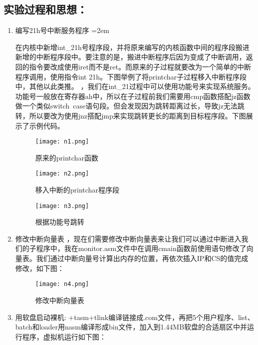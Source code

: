 \documentclass[UTF8]{article}
\newcommand{\bg}{\colorbox{gray!13}}%
\begin{document}
\subsection{实验过程和思想：}
\begin{enumerate}[1)]
\heiti\setlength{\itemsep}{0em}
	\item 编写21h号中断服务程序
	\parindent=2em %
	\par\indent 在内核中新增int\_21h号程序段，并将原来编写的内核函数中间的程序段搬进新增的中断程序段中。要注意的是，搬进中断程序后因为变成了中断调用，返回的指令要改成使用iret而不是ret。而原来的子过程就要改为一个简单的中断程序调用，使用指令\bg{int 21h}。下图举例了将\bg{printchar}子过程移入中断程序段中，其他以此类推。
，我们在int\_21过程中可以使用功能号来实现系统服务。功能号一般放在寄存器\bg{ah}中，所以在子过程前我们需要用cmp函数搭配jz函数做一个类似\bg{switch\ case}语句段。但会发现因为跳转距离过长，导致jz无法跳转，所以要改为使用jnz搭配jmp来实现跳转更长的距离到目标程序段。下图展示了示例代码。
			\begin{figure}[htbp]
			\begin{minipage}[t]{\linewidth}
			\centering
			\texttt{[image: n1.png]}
			\caption{原来的printchar函数}
			\end{minipage}
			\begin{minipage}[t]{\linewidth}
				\centering
			\texttt{[image: n2.png]}
			\caption{移入中断的printchar程序段}
			\end{minipage}
			\begin{minipage}[t]{\linewidth}
			\centering
			\texttt{[image: n3.png]}
			\caption{根据功能号跳转}
			\end{minipage}
		\end{figure}
	\newpage
	\item 修改中断向量表
	，现在们需要修改中断向量表来让我们可以通过中断进入我们的子程序中，我在\bg{monitor.asm}文件中在调用\bg{cmain}函数前使用语句修改了向量表。我们通过中断向量号计算出内存的位置，再依次插入IP和CS的值完成修改，如下图：
	\begin{figure}[htbp]
			\centering
			\texttt{[image: n4.png]}
			\caption{修改中断向量表}
		\end{figure}
  \item 用软盘启动裸机:
  \heiti{}+tasm+tlink编译链接成.com文件，再把5个用户程序、list、batch和loader用nasm编译形成bin文件，加入到1.44MB软盘的合适扇区中并运行程序，虚拟机运行如下图：

\end{enumerate}
\end{document}
